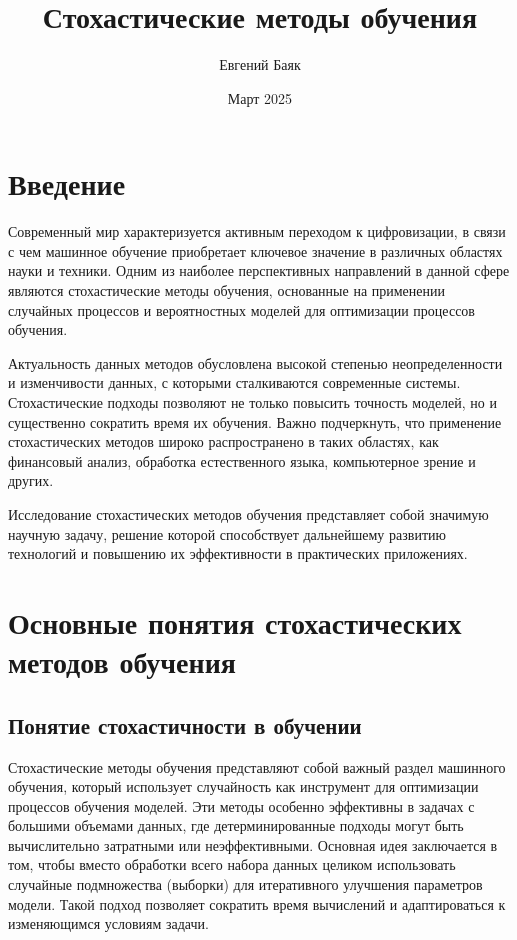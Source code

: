 \documentclass[11pt,a4paper]{article}
\title{Стохастические методы обучения}
\author{Евгений Баяк}
\date{Март 2025}
\begin{document}
\maketitle

\section*{Введение}
Современный мир характеризуется активным переходом к цифровизации, в связи с чем машинное обучение приобретает ключевое значение в различных областях науки и техники. Одним из наиболее перспективных направлений в данной сфере являются стохастические методы обучения, основанные на применении случайных процессов и вероятностных моделей для оптимизации процессов обучения.

Актуальность данных методов обусловлена высокой степенью неопределенности и изменчивости данных, с которыми сталкиваются современные системы. Стохастические подходы позволяют не только повысить точность моделей, но и существенно сократить время их обучения. Важно подчеркнуть, что применение стохастических методов широко распространено в таких областях, как финансовый анализ, обработка естественного языка, компьютерное зрение и других.

Исследование стохастических методов обучения представляет собой значимую научную задачу, решение которой способствует дальнейшему развитию технологий и повышению их эффективности в практических приложениях.


\section{Основные понятия стохастических методов обучения}

\subsection{Понятие стохастичности в обучении}
Стохастические методы обучения представляют собой важный раздел машинного обучения, который использует случайность как инструмент для оптимизации процессов обучения моделей. Эти методы особенно эффективны в задачах с большими объемами данных, где детерминированные подходы могут быть вычислительно затратными или неэффективными. Основная идея заключается в том, чтобы вместо обработки всего набора данных целиком использовать случайные подмножества (выборки) для итеративного улучшения параметров модели. Такой подход позволяет сократить время вычислений и адаптироваться к изменяющимся условиям задачи.
\end{document}
